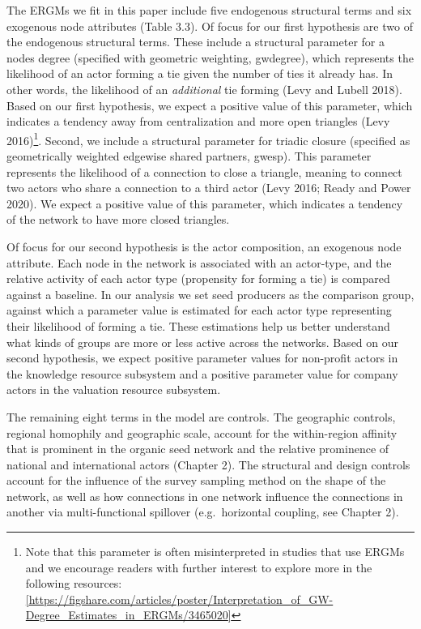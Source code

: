 \documentclass[twoside,12pt,final]{ucthesis-CA2012}
\begin{document}
\begin{ucmainmatter}
The ERGMs we fit in this paper include five endogenous structural terms
and six exogenous node attributes (Table 3.3). Of focus for our first
hypothesis are two of the endogenous structural terms. These include a
structural parameter for a node\textquotesingle s degree (specified with geometric
weighting, \textquotesingle gwdegree\textquotesingle), which represents the likelihood of an actor
forming a tie given the number of ties it already has. In other words,
the likelihood of an \emph{additional} tie forming (Levy and Lubell 2018).
Based on our first hypothesis, we expect a positive value of this
parameter, which indicates a tendency away from centralization and more
open triangles (Levy 2016)\footnote{Note that this parameter is often misinterpreted in studies that
  use ERGMs and we encourage readers with further interest to explore
  more in the following resources:
  \href{https://figshare.com/articles/poster/Interpretation_of_GW-Degree_Estimates_in_ERGMs/3465020}{{[}https://figshare.com/articles/poster/Interpretation\_of\_GW-Degree\_Estimates\_in\_ERGMs/3465020{]}}}. Second, we include a structural
parameter for \textquotesingle triadic closure\textquotesingle{} (specified as geometrically weighted
edgewise shared partners, \textquotesingle gwesp\textquotesingle). This parameter represents the
likelihood of a connection to close a triangle, meaning to connect two
actors who share a connection to a third actor (Levy 2016; Ready and
Power 2020). We expect a positive value of this parameter, which
indicates a tendency of the network to have more closed triangles.

Of focus for our second hypothesis is the actor composition, an
exogenous node attribute. Each node in the network is associated with an
actor-type, and the relative activity of each actor type (propensity for
forming a tie) is compared against a baseline. In our analysis we set
seed producers as the comparison group, against which a parameter value
is estimated for each actor type representing their likelihood of
forming a tie. These estimations help us better understand what kinds of
groups are more or less active across the networks. Based on our second
hypothesis, we expect positive parameter values for non-profit actors in
the knowledge resource subsystem and a positive parameter value for
company actors in the valuation resource subsystem.

The remaining eight terms in the model are controls. The geographic
controls, regional homophily and geographic scale, account for the
within-region affinity that is prominent in the organic seed network and
the relative prominence of national and international actors (Chapter
2). The structural and design controls account for the influence of the
survey sampling method on the shape of the network, as well as how
connections in one network influence the connections in another via
multi-functional spillover (e.g.~horizontal coupling, see Chapter 2).


\end{ucmainmatter}
\end{document}

